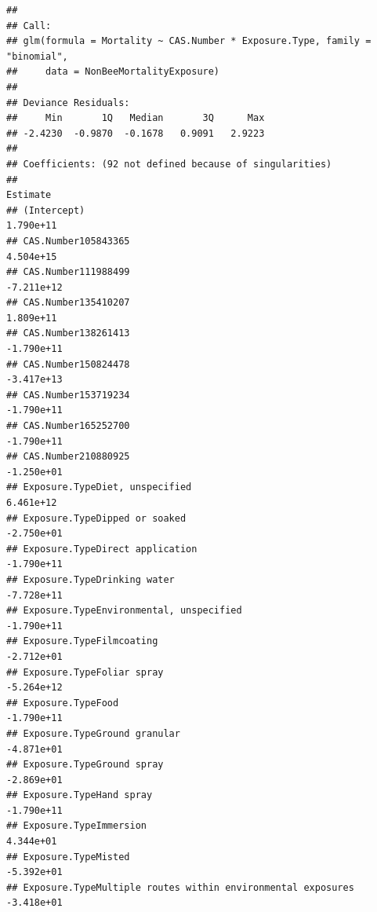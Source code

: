 \documentclass[
  12pt,
]{article}
\begin{document}
\begin{verbatim}
## 
## Call:
## glm(formula = Mortality ~ CAS.Number * Exposure.Type, family = "binomial", 
##     data = NonBeeMortalityExposure)
## 
## Deviance Residuals: 
##     Min       1Q   Median       3Q      Max  
## -2.4230  -0.9870  -0.1678   0.9091   2.9223  
## 
## Coefficients: (92 not defined because of singularities)
##                                                                                   Estimate
## (Intercept)                                                                      1.790e+11
## CAS.Number105843365                                                              4.504e+15
## CAS.Number111988499                                                             -7.211e+12
## CAS.Number135410207                                                              1.809e+11
## CAS.Number138261413                                                             -1.790e+11
## CAS.Number150824478                                                             -3.417e+13
## CAS.Number153719234                                                             -1.790e+11
## CAS.Number165252700                                                             -1.790e+11
## CAS.Number210880925                                                             -1.250e+01
## Exposure.TypeDiet, unspecified                                                   6.461e+12
## Exposure.TypeDipped or soaked                                                   -2.750e+01
## Exposure.TypeDirect application                                                 -1.790e+11
## Exposure.TypeDrinking water                                                     -7.728e+11
## Exposure.TypeEnvironmental, unspecified                                         -1.790e+11
## Exposure.TypeFilmcoating                                                        -2.712e+01
## Exposure.TypeFoliar spray                                                       -5.264e+12
## Exposure.TypeFood                                                               -1.790e+11
## Exposure.TypeGround granular                                                    -4.871e+01
## Exposure.TypeGround spray                                                       -2.869e+01
## Exposure.TypeHand spray                                                         -1.790e+11
## Exposure.TypeImmersion                                                           4.344e+01
## Exposure.TypeMisted                                                             -5.392e+01
## Exposure.TypeMultiple routes within environmental exposures                     -3.418e+01

\end{verbatim}
\end{document}
